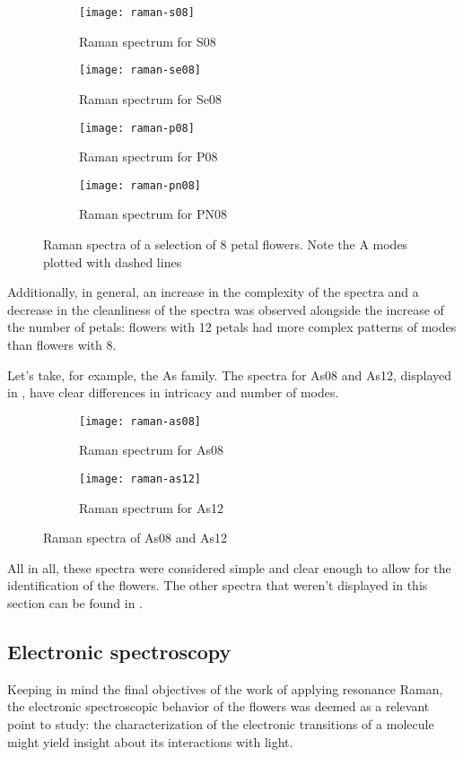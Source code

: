 \begin{figure*}[h]
    \centering
    \begin{subfigure}{8.25cm}\centering\texttt{[image: raman-s08]}\caption{Raman spectrum for S08}\end{subfigure}%
    \begin{subfigure}{8.25cm}\centering\texttt{[image: raman-se08]}\caption{Raman spectrum for Se08}\end{subfigure}
    \begin{subfigure}{8.25cm}\centering\texttt{[image: raman-p08]}\caption{Raman spectrum for P08}\end{subfigure}%
    \begin{subfigure}{8.25cm}\centering\texttt{[image: raman-pn08]}\caption{Raman spectrum for PN08}\end{subfigure}
    \caption[Raman spectra of 8 petal flowers]{Raman spectra of a selection of 8 petal flowers. Note the A modes plotted with dashed lines}
\end{figure*}

Additionally, in general, an increase in the complexity of the spectra and a decrease in the cleanliness of the spectra was observed alongside the increase of the number of petals: flowers with 12 petals had more complex patterns of modes than flowers with 8.

Let's take, for example, the As family.
The spectra for As08 and As12, displayed  in , have clear differences in intricacy and number of modes.

\begin{figure*}[h]
    \centering
    \begin{subfigure}{8.25cm}\centering\texttt{[image: raman-as08]}\caption{Raman spectrum for As08}\end{subfigure}%
    \begin{subfigure}{8.25cm}\centering\texttt{[image: raman-as12]}\caption{Raman spectrum for As12}\end{subfigure}
    \caption[Raman spectra of As08 and As12]{Raman spectra of As08 and As12}
\end{figure*}

All in all, these spectra were considered simple and clear enough to allow for the identification of the flowers.
The other spectra that weren't displayed in this section can be found in .

\subsection{Electronic spectroscopy}
Keeping in mind the final objectives of the work of applying resonance Raman, the electronic spectroscopic behavior of the flowers was deemed as a relevant point to study: the characterization of the electronic transitions of a molecule might yield insight about its interactions with light.

